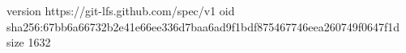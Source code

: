 version https://git-lfs.github.com/spec/v1
oid sha256:67bb6a66732b2e41e66ee336d7baa6ad9f1bdf875467746eea260749f0647f1d
size 1632
